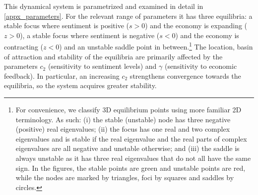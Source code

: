 \documentclass[authoryear, review]{elsarticle}
\begin{document}
This dynamical system is parametrized and examined in detail in \ref{appx_parameters}. For the relevant range of parameters it has three equilibria: a stable focus where sentiment is positive ($s>0$) and the economy is expanding ($z>0$), a stable focus where sentiment is negative ($s<0$) and the economy is contracting ($z<0$) and an unstable saddle point in between.\footnote{For convenience, we classify 3D equilibrium points using more familiar 2D terminology. As such: (i) the stable (unstable) node has three negative (positive) real eigenvalues; (ii) the focus has one real and two complex eigenvalues and is stable if the real eigenvalue and the real parts of complex eigenvalues are all negative and unstable otherwise; and (iii) the saddle is always unstable as it has three real eigenvalues that do not all have the same sign. In the figures, the stable points are green and unstable points are red, while the nodes are marked by triangles, foci by squares and saddles by circles.\label{point notatrion}} The location, basin of attraction and stability of the equilibria are primarily affected by the parameters $c_2$ (sensitivity to sentiment levels) and $\gamma$ (sensitivity to economic feedback). In particular, an  increasing $c_2$ strengthens convergence towards the equilibria, so the system acquires greater stability.
\end{document}
